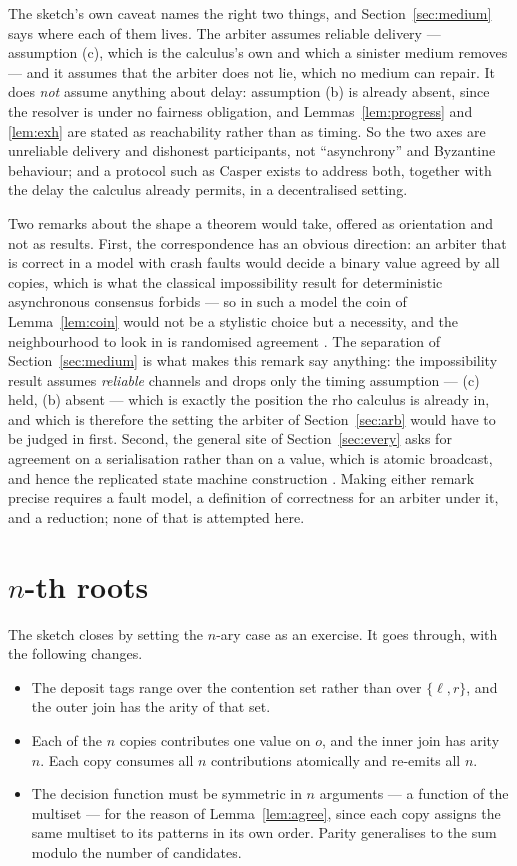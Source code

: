 \documentclass[11pt]{article}
\theoremstyle{definition}
\newcommand{\rhoc}{rho calculus}
\begin{document}
The sketch's own caveat names the right two things, and Section~\ref{sec:medium} says where each of them lives. The arbiter assumes reliable delivery --- assumption (c), which is the calculus's own and which a sinister medium removes --- and it assumes that the arbiter does not lie, which no medium can repair. It does \emph{not} assume anything about delay: assumption (b) is already absent, since the resolver is under no fairness obligation, and Lemmas~\ref{lem:progress} and \ref{lem:exh} are stated as reachability rather than as timing. So the two axes are unreliable delivery and dishonest participants, not ``asynchrony'' and Byzantine behaviour; and a protocol such as Casper exists to address both, together with the delay the calculus already permits, in a decentralised setting.

Two remarks about the shape a theorem would take, offered as orientation and not as results. First, the correspondence has an obvious direction: an arbiter that is correct in a model with crash faults would decide a binary value agreed by all copies, which is what the classical impossibility result for deterministic asynchronous consensus \cite{FLP} forbids --- so in such a model the coin of Lemma~\ref{lem:coin} would not be a stylistic choice but a necessity, and the neighbourhood to look in is randomised agreement \cite{BenOr}. The separation of Section~\ref{sec:medium} is what makes this remark say anything: the impossibility result assumes \emph{reliable} channels and drops only the timing assumption --- (c) held, (b) absent --- which is exactly the position the \rhoc{} is already in, and which is therefore the setting the arbiter of Section~\ref{sec:arb} would have to be judged in first. Second, the general site of Section~\ref{sec:every} asks for agreement on a serialisation rather than on a value, which is atomic broadcast, and hence the replicated state machine construction \cite{Schneider}. Making either remark precise requires a fault model, a definition of correctness for an arbiter under it, and a reduction; none of that is attempted here.

\section{$n$-th roots}\label{sec:nth}

The sketch closes by setting the $n$-ary case as an exercise. It goes through, with the following changes.

\begin{itemize}
\item The deposit tags range over the contention set rather than over $\{\ell, r\}$, and the outer join has the arity of that set.
\item Each of the $n$ copies contributes one value on $o$, and the inner join has arity $n$. Each copy consumes all $n$ contributions atomically and re-emits all $n$.
\item The decision function must be symmetric in $n$ arguments --- a function of the multiset --- for the reason of Lemma~\ref{lem:agree}, since each copy assigns the same multiset to its patterns in its own order. Parity generalises to the sum modulo the number of candidates.
\end{itemize}
\end{document}

